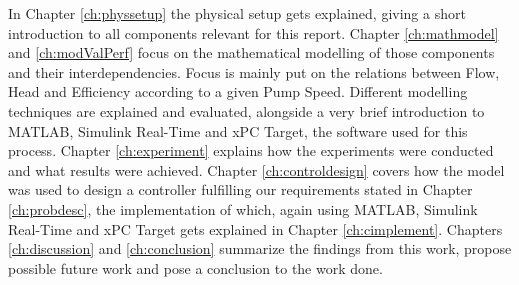 In Chapter \ref{ch:physsetup} the physical setup gets explained,
giving a short introduction to all components relevant for this report.
Chapter \ref{ch:mathmodel} and \ref{ch:modValPerf}
focus on the mathematical modelling of those components and their interdependencies.
Focus is mainly put on the relations between Flow, Head and Efficiency according to a given Pump Speed.
Different modelling techniques are explained and evaluated,
alongside a very brief introduction to MATLAB\textsuperscript{\textregistered{}},
Simulink\textsuperscript{\textregistered{}} Real-Time\texttrademark{} and xPC Target,
the software used for this process.
Chapter \ref{ch:experiment} explains how the experiments were conducted
and what results were achieved.
Chapter \ref{ch:controldesign} covers how the model was used to design a controller
fulfilling our requirements stated in Chapter \ref{ch:probdesc},
the implementation of which,
again using
MATLAB\textsuperscript{\textregistered{}},
Simulink\textsuperscript{\textregistered{}} Real-Time\texttrademark{}
and xPC Target gets explained in Chapter \ref{ch:cimplement}.
Chapters \ref{ch:discussion} and \ref{ch:conclusion} summarize the findings from this work,
propose possible future work and pose a conclusion to the work done.
